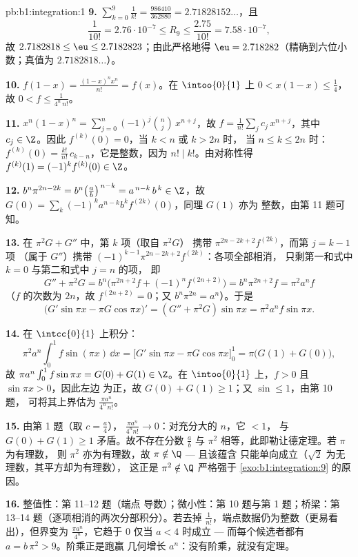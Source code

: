 \begin{solution}{pb:b1:integration:1}
\textbf{9.} $\sum_{k=0}^{9} \frac{1}{k!} = \frac{986410}{362880}
= 2.71828152\dots$，且
\[
\frac{1}{10!} = 2.76\cdot10^{-7} \leq R_9 \leq
\frac{2.75}{10!} = 7.58\cdot10^{-7} ,
\]
故 $2.7182818 \leq \eu \leq 2.7182823$；由此严格地得 $\eu =
2.718282$（精确到六位小数；真值为 $2.7182818\dots$）。

\textbf{10.} $f(1 - x) = \frac{(1-x)^n x^n}{n!} = f(x)$。在
$\intoo{0}{1}$ 上 $0 < x(1-x) \leq \frac14$，故 $0 < f \leq
\frac{1}{4^n\,n!}$。

\textbf{11.} $x^n(1-x)^n = \sum_{j=0}^{n} (-1)^j\binom
nj\,x^{n+j}$，故 $f = \frac{1}{n!}\sum_j c_j\,x^{n+j}$，其中
$c_j \in \Z$。因此 $f^{(k)}(0) = 0$，当 $k < n$ 或 $k > 2n$ 时，
当 $n \leq k \leq 2n$ 时：$f^{(k)}(0) = \frac{k!}{n!}\,
c_{k-n}$，它是整数，因为 $n! \mid k!$。由对称性得
$f^{(k)}(1) = (-1)^k f^{(k)}(0) \in \Z$。

\textbf{12.} $b^n \pi^{2n-2k} = b^n\bigl(\frac
ab\bigr)^{\,n-k} = a^{\,n-k}\,b^{\,k} \in \Z$，故 $G(0) =
\sum_k (-1)^k a^{n-k} b^k f^{(2k)}(0)$，同理 $G(1)$ 亦为
整数，由第 11 题可知。

\textbf{13.} 在 $\pi^2 G + G''$ 中，第 $k$ 项（取自 $\pi^2 G$）
携带 $\pi^{2n-2k+2}f^{(2k)}$，而第 $j = k - 1$ 项
（属于 $G''$）携带 $(-1)^{k-1}\pi^{2n-2k+2}f^{(2k)}$：各项全部相消，
只剩第一和式中 $k = 0$ 与第二和式中 $j = n$ 的项，
即
\[
G'' + \pi^2 G = b^n\bigl(\pi^{2n+2} f + (-1)^n f^{(2n+2)}\bigr)
= b^n \pi^{2n+2} f = \pi^2 a^n f
\]
（$f$ 的次数为 $2n$，故 $f^{(2n+2)} = 0$；又 $b^n\pi^{2n} =
a^n$）。于是
\[
\bigl(G'\sin\pi x - \pi G\cos\pi x\bigr)'
= (G'' + \pi^2 G)\sin \pi x = \pi^2 a^n f\sin\pi x .
\]

\textbf{14.} 在 $\intcc{0}{1}$ 上积分：
\[
\pi^2 a^n \int_0^1 f\sin(\pi x)\,\dd x
= \bigl[G'\sin\pi x - \pi G\cos\pi x\bigr]_0^1
= \pi\bigl(G(1) + G(0)\bigr) ,
\]
故 $\pi a^n \int_0^1 f\sin\pi x = G(0) + G(1) \in \Z$。在
$\intoo{0}{1}$ 上，$f > 0$ 且 $\sin\pi x > 0$，因此左边
为正，故 $G(0) + G(1) \geq 1$；又 $\sin \leq 1$，由第 10 题，
可将其上界估为 $\frac{\pi a^n}{4^n\,n!}$。

\textbf{15.} 由第 1 题（取 $c = \frac a4$），
$\frac{\pi a^n}{4^n n!} \to 0$：对充分大的 $n$，它 $< 1$，
与 $G(0) + G(1) \geq 1$ 矛盾。故不存在分数 $\frac ab$
与 $\pi^2$ 相等，此即勒让德定理。若 $\pi$ 为有理数，
则 $\pi^2$ 亦为有理数，故 $\pi \notin \Q$ --- 且该蕴含
只能单向成立（$\sqrt2$ 为无理数，其平方却为有理数），
这正是 $\pi^2 \notin \Q$ 严格强于
\cref{exo:b1:integration:9} 的原因。

\textbf{16.} 整值性：第 11--12 题（端点
导数）；微小性：第 10 题与第 1 题；桥梁：第
13--14 题（逐项相消的两次分部积分）。若去掉
$\frac{1}{n!}$，端点数据仍为整数（更易看出），但界变为
$\frac{\pi a^n}{4^n}$，它趋于 $0$ 仅当
$a < 4$ 时成立 --- 而每个候选者都有 $a =
b\,\pi^2 > 9$。阶乘正是跑赢
几何增长 $a^n$：没有阶乘，就没有定理。


\end{solution}
